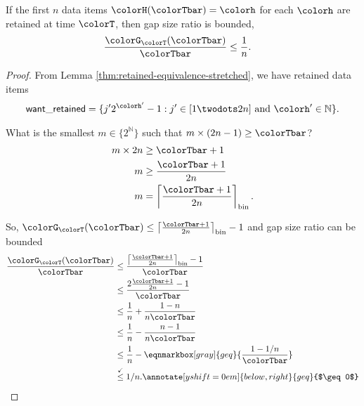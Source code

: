 \begin{lemma}
\label{thm:gap-size-ratio-stretched}
If the first $n$ data items $\colorH(\colorTbar) = \colorh$ for each \hv{} $\colorh$ are retained at time $\colorT$, then gap size ratio is bounded,
\begin{align*}
\frac{\colorG_{\colorT}(\colorTbar)}{\colorTbar}
&\leq
\frac{1}{n}.
\end{align*}
\end{lemma}
\begin{proof}

From Lemma \ref{thm:retained-equivalence-stretched}, we have retained data items
\begin{align*}
\mathsf{want\_retained} =
\{
  j'2^{\colorh'} - 1
  :
  j' \in [1 \twodots 2n]
  \text{ and }
  \colorh' \in \mathbb{N}
\}.
\end{align*}


What is the smallest $m \in \{2^{\mathbb{N}}\}$ such that $m \times (2n - 1) \geq \colorTbar$?
\begin{align*}
m \times 2n
&\geq \colorTbar + 1\\
m
&\geq \frac{\colorTbar + 1}{2n}\\
m
&= \left\lceil \frac{\colorTbar + 1 }{2n} \right\rceil_{\mathrm{bin}}.
\end{align*}

So, $\colorG_{\colorT}(\colorTbar) \leq \left\lceil \frac{\colorTbar + 1 }{2n} \right\rceil_{\mathrm{bin}} - 1$ and gap size ratio can be bounded
\begin{align*}
\frac{\colorG_{\colorT}(\colorTbar)}{\colorTbar}
&\leq
\frac{
\left\lceil \frac{\colorTbar + 1 }{2n} \right\rceil_{\mathrm{bin}} - 1
}{
\colorTbar
}\\
&\leq
\frac{
2\frac{\colorTbar + 1}{2n} - 1
}{
\colorTbar
}\\
&\leq
\frac{1}{n} + \frac{1 - n}{n\colorTbar}\\
&\leq
\frac{1}{n} - \frac{n - 1}{n\colorTbar}\\
&\leq
\frac{1}{n} - \eqnmarkbox[gray]{geq}{\frac{1 - 1/n}{\colorTbar}}\\
&\stackrel{\checkmark}{\leq}
1 / n.
\annotate[yshift=0em]{below,right}{geq}{$\geq 0$}
\end{align*}

\end{proof}
